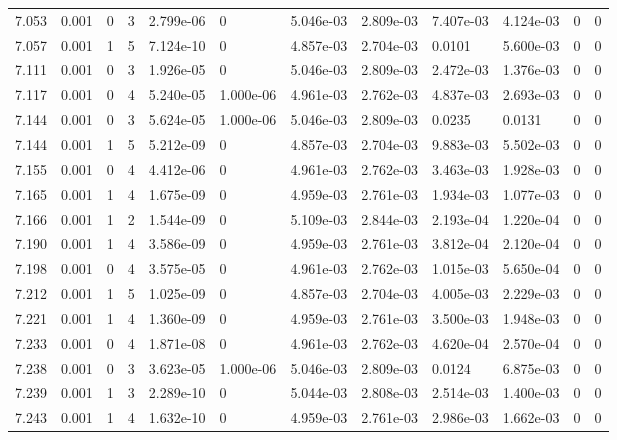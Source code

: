 \documentclass[preview]{standalone}
\begin{document}
{{{{{{{{{\begin{tabular}{L{1.2cm}C{1.2cm} C{0.3cm}C{0.5cm} C{1.4cm}C{1.4cm} C{1.4cm}C{1.4cm} C{1.6cm}C{1.6cm} C{1.6cm}C{1.6cm}}
  7.053  &  0.001  & 0     &  3 &  2.799e-06  & 0  &  5.046e-03&   2.809e-03& 7.407e-03 & 4.124e-03   &  0 & 0  \\ 
  7.057  &  0.001  & 1     &  5 &  7.124e-10  & 0  &  4.857e-03&   2.704e-03& 0.0101 & 5.600e-03   &  0 & 0  \\ 
  7.111  &  0.001  & 0     &  3 &  1.926e-05  & 0  &  5.046e-03&   2.809e-03& 2.472e-03 & 1.376e-03   &  0 & 0  \\ 
  7.117  &  0.001  & 0     &  4 &  5.240e-05  & 1.000e-06  &  4.961e-03&   2.762e-03& 4.837e-03 & 2.693e-03   &  0 & 0  \\ 
  7.144  &  0.001  & 0     &  3 &  5.624e-05  & 1.000e-06  &  5.046e-03&   2.809e-03& 0.0235 & 0.0131   &  0 & 0  \\ 
  7.144  &  0.001  & 1     &  5 &  5.212e-09  & 0  &  4.857e-03&   2.704e-03& 9.883e-03 & 5.502e-03   &  0 & 0  \\ 
  7.155  &  0.001  & 0     &  4 &  4.412e-06  & 0  &  4.961e-03&   2.762e-03& 3.463e-03 & 1.928e-03   &  0 & 0  \\ 
  7.165  &  0.001  & 1     &  4 &  1.675e-09  & 0  &  4.959e-03&   2.761e-03& 1.934e-03 & 1.077e-03   &  0 & 0  \\ 
  7.166  &  0.001  & 1     &  2 &  1.544e-09  & 0  &  5.109e-03&   2.844e-03& 2.193e-04 & 1.220e-04   &  0 & 0  \\ 
  7.190  &  0.001  & 1     &  4 &  3.586e-09  & 0  &  4.959e-03&   2.761e-03& 3.812e-04 & 2.120e-04   &  0 & 0  \\ 
  7.198  &  0.001  & 0     &  4 &  3.575e-05  & 0  &  4.961e-03&   2.762e-03& 1.015e-03 & 5.650e-04   &  0 & 0  \\ 
  7.212  &  0.001  & 1     &  5 &  1.025e-09  & 0  &  4.857e-03&   2.704e-03& 4.005e-03 & 2.229e-03   &  0 & 0  \\ 
  7.221  &  0.001  & 1     &  4 &  1.360e-09  & 0  &  4.959e-03&   2.761e-03& 3.500e-03 & 1.948e-03   &  0 & 0  \\ 
  7.233  &  0.001  & 0     &  4 &  1.871e-08  & 0  &  4.961e-03&   2.762e-03& 4.620e-04 & 2.570e-04   &  0 & 0  \\ 
  7.238  &  0.001  & 0     &  3 &  3.623e-05  & 1.000e-06  &  5.046e-03&   2.809e-03& 0.0124 & 6.875e-03   &  0 & 0  \\ 
  7.239  &  0.001  & 1     &  3 &  2.289e-10  & 0  &  5.044e-03&   2.808e-03& 2.514e-03 & 1.400e-03   &  0 & 0  \\ 
  7.243  &  0.001  & 1     &  4 &  1.632e-10  & 0  &  4.959e-03&   2.761e-03& 2.986e-03 & 1.662e-03   &  0 & 0  \\ 

\end{tabular}}}}}}}}}}
\end{document}
